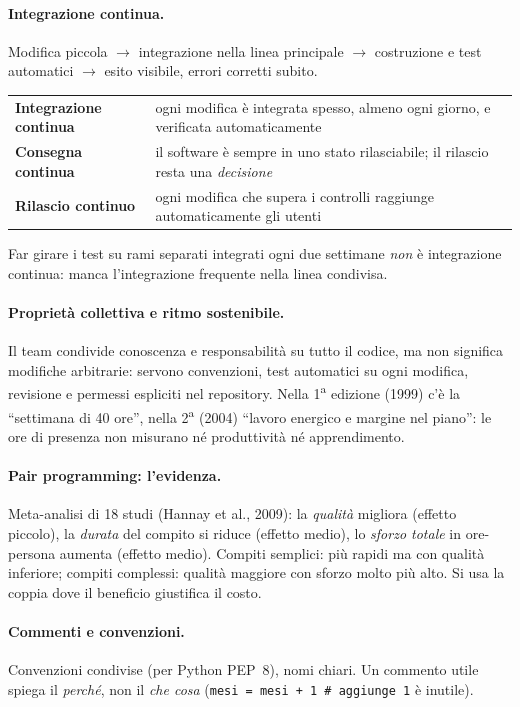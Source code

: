 \documentclass[a4paper,12pt]{article}
\begin{document}
\paragraph{Integrazione continua.} Modifica piccola $\to$ integrazione nella linea
principale $\to$ costruzione e test automatici $\to$ esito visibile, errori corretti subito.
\begin{center}
\begin{tabular}{|p{3.6cm}|p{11cm}|}
\hline
\textbf{Integrazione continua} & ogni modifica è integrata spesso, almeno ogni giorno, e verificata automaticamente\\
\textbf{Consegna continua} & il software è sempre in uno stato rilasciabile; il rilascio resta una \emph{decisione}\\
\textbf{Rilascio continuo} & ogni modifica che supera i controlli raggiunge automaticamente gli utenti\\
\hline
\end{tabular}
\end{center}
Far girare i test su rami separati integrati ogni due settimane \emph{non} è integrazione
continua: manca l'integrazione frequente nella linea condivisa.

\paragraph{Proprietà collettiva e ritmo sostenibile.} Il team condivide conoscenza e
responsabilità su tutto il codice, ma non significa modifiche arbitrarie: servono
convenzioni, test automatici su ogni modifica, revisione e permessi espliciti nel
repository. Nella 1\textsuperscript{a} edizione (1999) c'è la ``settimana di 40 ore'', nella
2\textsuperscript{a} (2004) ``lavoro energico e margine nel piano'': le ore di presenza non
misurano né produttività né apprendimento.

\paragraph{Pair programming: l'evidenza.} Meta-analisi di 18 studi (Hannay et al., 2009):
la \emph{qualità} migliora (effetto piccolo), la \emph{durata} del compito si riduce (effetto
medio), lo \emph{sforzo totale} in ore-persona aumenta (effetto medio). Compiti semplici: più
rapidi ma con qualità inferiore; compiti complessi: qualità maggiore con sforzo molto più alto.
Si usa la coppia dove il beneficio giustifica il costo.

\paragraph{Commenti e convenzioni.} Convenzioni condivise (per Python PEP~8), nomi chiari.
Un commento utile spiega il \emph{perché}, non il \emph{che cosa} (\texttt{mesi = mesi + 1
\# aggiunge 1} è inutile).
\end{document}

